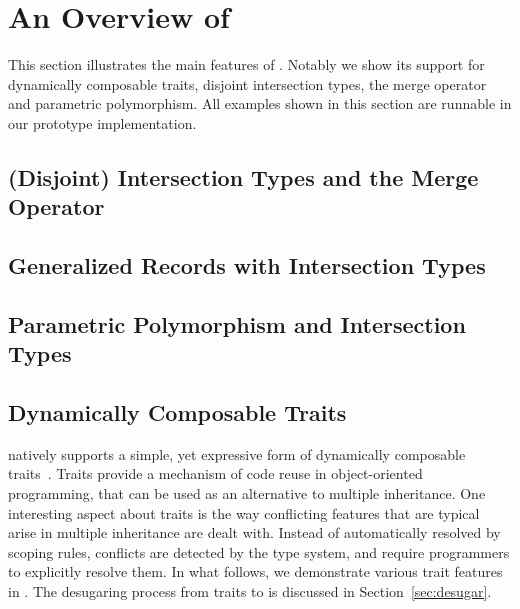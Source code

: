 \section{An Overview of \name}



This section illustrates the main features of \name. Notably we show its support
for dynamically composable traits, disjoint intersection types, the merge
operator and parametric polymorphism. All examples shown in this section are
runnable in our prototype implementation.



\subsection{(Disjoint) Intersection Types and the Merge Operator}
\label{sec:intersection}


\subsection{Generalized Records with Intersection Types}
\label{sec:records}


\subsection{Parametric Polymorphism and Intersection Types}
\label{sec:polymorphism}


\subsection{Dynamically Composable Traits}
\label{sec:traits}

\name natively supports a simple, yet expressive form of dynamically composable
traits~\cite{scharli2003traits}. Traits provide a mechanism of code reuse in
object-oriented programming, that can be used as an alternative to multiple
inheritance. One interesting aspect about traits is the way conflicting features
that are typical arise in multiple inheritance are dealt with. Instead of
automatically resolved by scoping rules, conflicts are detected by the type
system, and require programmers to explicitly resolve them. In what follows, we
demonstrate various trait features in \name. The desugaring process from traits
to \bname is discussed in Section~\ref{sec:desugar}.

